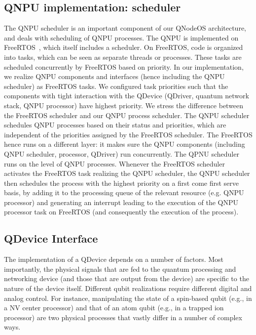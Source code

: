 \subsection{QNPU implementation: scheduler}
\label{qnodeos:sec:qnpu_impl_scheduler}
The \ac{QNPU} scheduler is an important component of our \ac{QNodeOS} architecture, and deals with scheduling of QNPU processes. The QNPU is implemented on FreeRTOS~\cite{freertos}, which itself includes a scheduler. On FreeRTOS, code is organized into tasks, which can be seen as separate threads or processes. These tasks are scheduled concurrently by FreeRTOS based on priority. In our implementation, we realize QNPU components and interfaces (hence including the QNPU scheduler) as FreeRTOS tasks. We configured task priorities such that the components with tight interaction with the QDevice (\ac{QDriver}, quantum network stack, QNPU processor) have highest priority.
We stress the difference between the FreeRTOS scheduler and our QNPU process scheduler. 
The QNPU scheduler schedules QNPU processes based on their status and priorities, which are independent of the priorities assigned by the FreeRTOS scheduler.
The FreeRTOS hence runs on a different layer: it makes sure the QNPU components (including QNPU scheduler, processor, \ac{QDriver}) run concurrently. The QPNU scheduler runs on the level of QNPU processes. Whenever the FreeRTOS scheduler activates the FreeRTOS task realizing the QNPU scheduler, the QNPU scheduler then schedules the process with the highest priority on a first come first serve basis, by adding it to the processing queue of the relevant resource (e.g. QNPU processor) and generating an interrupt leading to the execution of the QNPU processor task on FreeRTOS (and consequently the execution of the process).

\subsection{QDevice Interface}
\label{qnodeos:sec:appendix-qdevice}

The implementation of a \ac{QDevice} depends on a number of factors. Most importantly, the physical signals that are fed to the quantum processing and networking device (and those that are output from the device) are specific to the nature of the device itself. Different qubit realizations require different digital and analog control. For instance, manipulating the state of a spin-based qubit (e.g., in a \ac{NV} center processor) and that of an atom qubit (e.g., in a trapped ion processor) are two physical processes that vastly differ in a number of complex ways.

